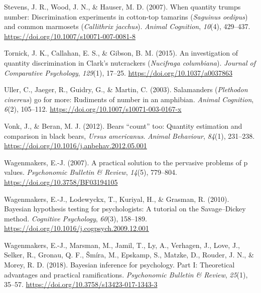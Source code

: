 \documentclass[
  ,pub,floatsintext]{apa6}
\newlength{\cslhangindent}
\newlength{\cslentryspacingunit} %
\newenvironment{CSLReferences}[2] %
 {%
  \setlength{\parindent}{0pt}
  \ifodd #1
  \let\oldpar\par
  \def\par{\hangindent=\cslhangindent\oldpar}
  \fi
  \setlength{\parskip}{#2\cslentryspacingunit}
 }%
 {}
\begin{document}
\begin{CSLReferences}{1}{0}
\leavevmode{}%
Stevens, J. R., Wood, J. N., \& Hauser, M. D. (2007). When quantity trumps number: Discrimination experiments in cotton-top tamarins (\emph{{Saguinus} oedipus}) and common marmosets (\emph{{Callithrix} jacchus}). \emph{Animal Cognition}, \emph{10}(4), 429--437. \url{https://doi.org/10.1007/s10071-007-0081-8}

\leavevmode{}%
Tornick, J. K., Callahan, E. S., \& Gibson, B. M. (2015). An investigation of quantity discrimination in {Clark}'s nutcrackers (\emph{{Nucifraga} columbiana}). \emph{Journal of Comparative Psychology}, \emph{129}(1), 17--25. \url{https://doi.org/10.1037/a0037863}

\leavevmode{}%
Uller, C., Jaeger, R., Guidry, G., \& Martin, C. (2003). Salamanders (\emph{{Plethodon} cinereus}) go for more: Rudiments of number in an amphibian. \emph{Animal Cognition}, \emph{6}(2), 105--112. \url{https://doi.org/10.1007/s10071-003-0167-x}

\leavevmode{}%
Vonk, J., \& Beran, M. J. (2012). Bears {``count''} too: Quantity estimation and comparison in black bears, \emph{{Ursus} americanus}. \emph{Animal Behaviour}, \emph{84}(1), 231--238. \url{https://doi.org/10.1016/j.anbehav.2012.05.001}

\leavevmode{}%
Wagenmakers, E.-J. (2007). A practical solution to the pervasive problems of p values. \emph{Psychonomic Bulletin \& Review}, \emph{14}(5), 779--804. \url{https://doi.org/10.3758/BF03194105}

\leavevmode{}%
Wagenmakers, E.-J., Lodewyckx, T., Kuriyal, H., \& Grasman, R. (2010). Bayesian hypothesis testing for psychologists: {A} tutorial on the {Savage}--{Dickey} method. \emph{Cognitive Psychology}, \emph{60}(3), 158--189. \url{https://doi.org/10.1016/j.cogpsych.2009.12.001}

\leavevmode{}%
Wagenmakers, E.-J., Marsman, M., Jamil, T., Ly, A., Verhagen, J., Love, J., Selker, R., Gronau, Q. F., Šmíra, M., Epskamp, S., Matzke, D., Rouder, J. N., \& Morey, R. D. (2018). Bayesian inference for psychology. {Part I}: {Theoretical} advantages and practical ramifications. \emph{Psychonomic Bulletin \& Review}, \emph{25}(1), 35--57. \url{https://doi.org/10.3758/s13423-017-1343-3}


\end{CSLReferences}
\end{document}
